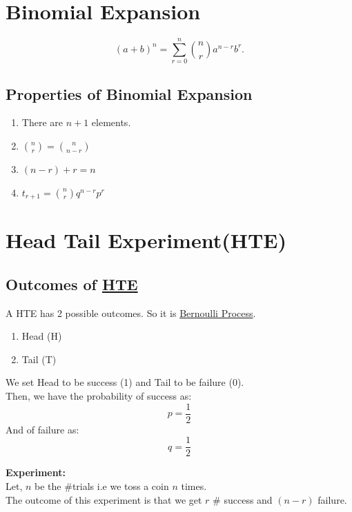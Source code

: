 \section{Binomial Expansion}
\label{sec:binomial-expansion}
\[
  (a+b)^{n} = \sum_{r=0}^{n}{\binom{n}{r} a^{n-r}b^{r}}
.\] 

\subsection{Properties of Binomial Expansion}
\label{ssec:properties-of-binomial-expansion}

\begin{enumerate}
  \item There are \(n+1\) elements.
  \item \(\binom{n}{r} = \binom{n}{n-r}\)
  \item \((n-r)+r = n\) 
  \item \(t_{r+1} = \binom{n}{r} q^{n-r} p^{r}\)
\end{enumerate}

\section{Head Tail Experiment(HTE)}
\label{sec:head-tail-experiment}

\subsection{Outcomes of \hyperref[sec:head-tail-experiment]{HTE}}
\label{ssec:outcomes-of-hte}

A HTE has 2 possible outcomes. So it is
\href{sec:bernoulli-process}{Bernoulli Process}.
\begin{enumerate}
  \item Head (H)
  \item Tail (T)
\end{enumerate}

We set Head to be success (1) and Tail to be failure (0).\\

Then, we have the probability of success as:
\[p = \frac{1}{2}\] 
And of failure as:
\[q = \frac{1}{2}\] 

\textbf{Experiment:}\\
Let, \(n\) be the \(\#\)trials i.e we toss a coin \(n\)
times.\\[10pt]
The outcome of this experiment is that we get \(r\) \(\#\)
success and \((n-r)\) failure.\\

